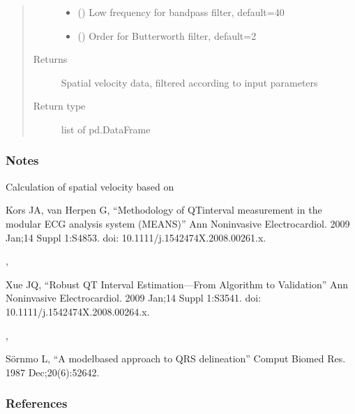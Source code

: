 \documentclass[letterpaper,10pt,english]{sphinxmanual}
\begin{document}
\begin{fulllineitems}
\begin{quote}
\begin{description}
\begin{itemize}
\item {} 
\sphinxAtStartPar
{} (\sphinxstyleliteralemphasis{\sphinxupquote{, }}) \textendash{} Low frequency for bandpass filter, default=40

\item {} 
\sphinxAtStartPar
{} (\sphinxstyleliteralemphasis{\sphinxupquote{, }}) \textendash{} Order for Butterworth filter, default=2

\end{itemize}

\item[{Returns}] \leavevmode
\sphinxAtStartPar
{} \textendash{} Spatial velocity data, filtered according to input parameters

\item[{Return type}] \leavevmode
\sphinxAtStartPar
list of pd.DataFrame

\end{description}\end{quote}
\subsubsection*{Notes}

\sphinxAtStartPar
Calculation of spatial velocity based on \sphinxstepexplicit %
\begin{footnote}[1]\label{\thesphinxscope.1}%
\sphinxAtStartFootnote
Kors JA, van Herpen G, “Methodology of QT\sphinxhyphen{}interval measurement in the modular ECG analysis system (MEANS)”
Ann Noninvasive Electrocardiol. 2009 Jan;14 Suppl 1:S48\sphinxhyphen{}53. doi: 10.1111/j.1542\sphinxhyphen{}474X.2008.00261.x.
%
\end{footnote}, \sphinxstepexplicit %
\begin{footnote}[2]\label{\thesphinxscope.2}%
\sphinxAtStartFootnote
Xue JQ, “Robust QT Interval Estimation—From Algorithm to Validation”
Ann Noninvasive Electrocardiol. 2009 Jan;14 Suppl 1:S35\sphinxhyphen{}41. doi: 10.1111/j.1542\sphinxhyphen{}474X.2008.00264.x.
%
\end{footnote}, \sphinxstepexplicit %
\begin{footnote}[3]\label{\thesphinxscope.3}%
\sphinxAtStartFootnote
Sörnmo L, “A model\sphinxhyphen{}based approach to QRS delineation”
Comput Biomed Res. 1987 Dec;20(6):526\sphinxhyphen{}42.
%
\end{footnote}
\subsubsection*{References}

\end{fulllineitems}
\end{document}
